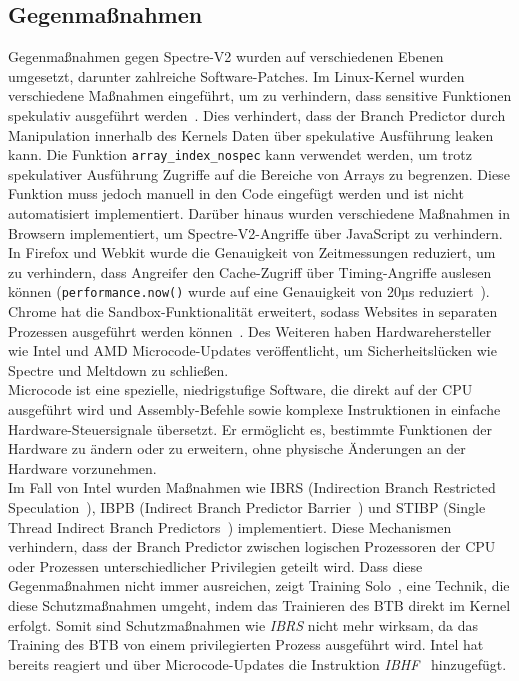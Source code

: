 \subsection{Gegenmaßnahmen}
\label{subsec:spectre_gegenmassnahmen}
Gegenmaßnahmen gegen Spectre-V2 wurden auf verschiedenen Ebenen umgesetzt, darunter zahlreiche Software-Patches.
Im Linux-Kernel wurden verschiedene Maßnahmen eingeführt, um zu verhindern, dass sensitive Funktionen spekulativ ausgeführt werden~\cite{linux_nospec}.
Dies verhindert, dass der Branch Predictor durch Manipulation innerhalb des Kernels Daten über spekulative Ausführung leaken kann.
Die Funktion \texttt{array\_index\_nospec} kann verwendet werden, um trotz spekulativer Ausführung Zugriffe auf die Bereiche von Arrays zu begrenzen.
Diese Funktion muss jedoch manuell in den Code eingefügt werden und ist nicht automatisiert implementiert.
Darüber hinaus wurden verschiedene Maßnahmen in Browsern implementiert, um Spectre-V2-Angriffe über JavaScript zu verhindern.
In Firefox und Webkit wurde die Genauigkeit von Zeitmessungen reduziert, um zu verhindern, dass Angreifer den Cache-Zugriff über Timing-Angriffe auslesen können (\texttt{performance.now()} wurde auf eine Genauigkeit von 20µs reduziert~\cite{luke_wagner_2018}).
Chrome hat die Sandbox-Funktionalität erweitert, sodass Websites in separaten Prozessen ausgeführt werden können~\cite{heise_2018_spec}.
Des Weiteren haben Hardwarehersteller wie Intel und AMD Microcode-Updates veröffentlicht, um Sicherheitslücken wie Spectre und Meltdown zu schließen. \\
Microcode ist eine spezielle, niedrigstufige Software, die direkt auf der CPU ausgeführt wird und Assembly-Befehle sowie komplexe Instruktionen in einfache Hardware-Steuersignale übersetzt.
Er ermöglicht es, bestimmte Funktionen der Hardware zu ändern oder zu erweitern, ohne physische Änderungen an der Hardware vorzunehmen. \\
Im Fall von Intel wurden Maßnahmen wie IBRS (Indirection Branch Restricted Speculation~\cite{intel_1}), IBPB (Indirect Branch Predictor Barrier~\cite{intel_2}) und STIBP (Single Thread Indirect Branch Predictors~\cite{intel_3}) implementiert.
Diese Mechanismen verhindern, dass der Branch Predictor zwischen logischen Prozessoren der CPU oder Prozessen unterschiedlicher Privilegien geteilt wird.
Dass diese Gegenmaßnahmen nicht immer ausreichen, zeigt Training Solo~\cite{training_solo}, eine Technik, die diese Schutzmaßnahmen umgeht, indem das Trainieren des BTB direkt im Kernel erfolgt.
Somit sind Schutzmaßnahmen wie \textit{IBRS} nicht mehr wirksam, da das Training des BTB von einem privilegierten Prozess ausgeführt wird.
Intel hat bereits reagiert und über Microcode-Updates die Instruktion \textit{IBHF}~\cite{darkcrizt_2025} hinzugefügt.